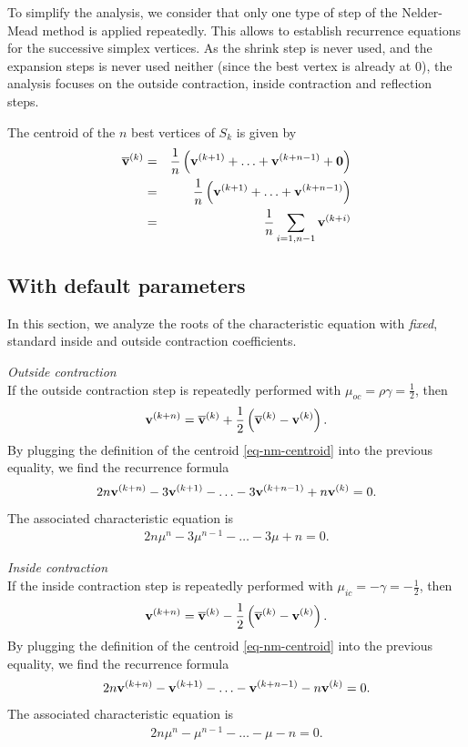 To simplify the analysis, we consider that only one type of step of the Nelder-Mead 
method is applied repeatedly. This allows to establish recurrence equations for the 
successive simplex vertices. As the shrink step is never used, and the expansion steps is 
never used neither (since the best vertex is already at 0), the analysis focuses
on the outside contraction, inside contraction and reflection steps.

The centroid of the $n$ best vertices of $S_k$ is given by 
\begin{eqnarray}
\overline{\bold{v}}^{(k)} 
&=&\frac{1}{n} \left( \mathbf{v}^{(k+1)} + \ldots + \mathbf{v}^{(k+n-1)} + \bold{0} \right)\\
&=&\frac{1}{n} \left( \mathbf{v}^{(k+1)} + \ldots + \mathbf{v}^{(k+n-1)} \right)\\
&=& \frac{1}{n} \sum_{i=1,n-1} \mathbf{v}^{(k+i)} \label{eq-nm-centroid}
\end{eqnarray}

\subsection{With default parameters}

In this section, we analyze the roots of the characteristic 
equation with \emph{fixed}, standard inside and outside contraction
coefficients.

\emph{Outside contraction} \\
If the outside contraction step is repeatedly performed
with $\mu_{oc} = \rho\gamma = \frac{1}{2}$, then 
\begin{eqnarray}
\mathbf{v}^{(k+n)} = \overline{\bold{v}}^{(k)} 
+ \frac{1}{2} \left( \overline{\bold{v}}^{(k)} - \mathbf{v}^{(k)}\right) .
\end{eqnarray}
By plugging the definition of the centroid \ref{eq-nm-centroid} into the previous equality, we 
find the recurrence formula
\begin{eqnarray}
2n \mathbf{v}^{(k+n)} - 3 \mathbf{v}^{(k+1)} - \ldots - 3 \mathbf{v}^{(k+n-1)} + n\mathbf{v}^{(k)} = 0.
\end{eqnarray}
The associated characteristic equation is 
\begin{eqnarray}
\label{recurrence-oc}
2n \mu^n - 3 \mu^{n-1} - \ldots - 3 \mu + n = 0.
\end{eqnarray}

\emph{Inside contraction} \\
If the inside contraction step is repeatedly performed
with $\mu_{ic} = -\gamma = -\frac{1}{2}$, then 
\begin{eqnarray}
\mathbf{v}^{(k+n)} = \overline{\bold{v}}^{(k)} 
- \frac{1}{2} \left( \overline{\bold{v}}^{(k)} - \mathbf{v}^{(k)}\right).
\end{eqnarray}
By plugging the definition of the centroid \ref{eq-nm-centroid} into the previous equality, we 
find the recurrence formula
\begin{eqnarray}
2n \mathbf{v}^{(k+n)} - \mathbf{v}^{(k+1)} - \ldots - \mathbf{v}^{(k+n-1)} - n\mathbf{v}^{(k)} = 0.
\end{eqnarray}
The associated characteristic equation is 
\begin{eqnarray}
\label{recurrence-ic}
2n \mu^n - \mu^{n-1} - \ldots - \mu - n = 0.
\end{eqnarray}

